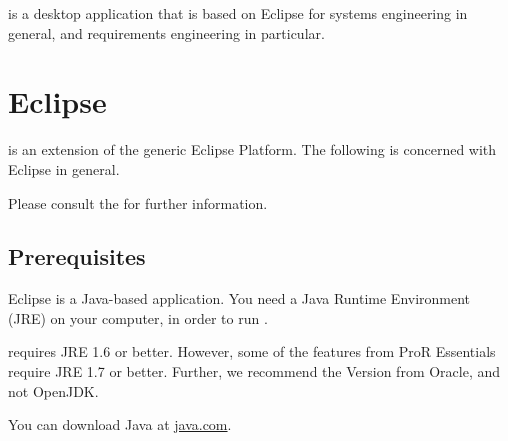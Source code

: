 % 

\pror{} is a desktop application that is based on Eclipse for systems engineering in general, and requirements engineering in particular.

\section{Eclipse}
\label{sec:eclipse}

\pror{} is an extension of the generic Eclipse Platform.  The following is concerned with Eclipse in general.

\begin{info}
Please consult the 
 for further information.
\end{info}

\subsection{Prerequisites}

Eclipse is a Java-based application.  You need a Java Runtime Environment (JRE) on your computer, in order to run \pror{}.

\pror{} requires JRE 1.6 or better.  However, some of the features from ProR Essentials require JRE 1.7 or better.  Further, we recommend the Version from Oracle, and not OpenJDK.

\begin{info}
You can download Java at \href{https://www.java.com}{java.com}.
\end{info}

